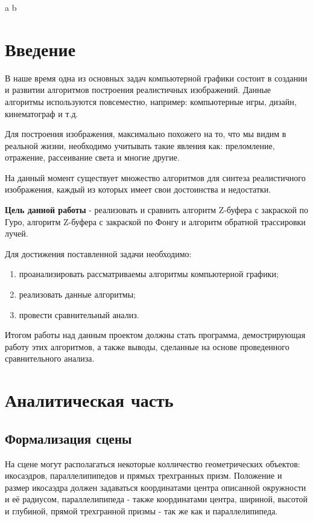 \documentclass[12pt]{report}
\begin{document}
	a
	\newpage
	b
	\newpage
	\tableofcontents
	\chapter*{Введение}
	В наше время одна из основных задач компьютерной графики состоит в создании и развитии алгоритмов построения реалистичных изображений. Данные алгоритмы используются повсеместно, например: компьютерные игры, дизайн, кинематограф и т.д. 
	
	Для построения изображения, максимально похожего на то, что мы видим в реальной жизни, необходимо учитывать такие явления как: преломление, отражение, рассеивание света и многие другие.
	
	На данный момент существует множество алгоритмов для синтеза реалистичного изображения, каждый из которых имеет свои достоинства и недостатки. 
	
	\textbf{Цель данной работы} - реализовать и сравнить алгоритм Z-буфера с закраской по Гуро, алгоритм Z-буфера с закраской по Фонгу и алгоритм обратной трассировки лучей.
	
	Для достижения поставленной задачи необходимо:
	\begin{enumerate}
		\item проанализировать рассматриваемы алгоритмы компьютерной графики;
		\item реализовать данные алгоритмы;
		\item провести сравнительный анализ.
	\end{enumerate}

	Итогом работы над данным проектом должны стать программа, демострирующая работу этих алгоритмов, а также выводы, сделанные на основе проведенного сравнительного анализа.
	
	\chapter{Аналитическая часть}
	\section{Формализация сцены}
	
		На сцене могут располагаться некоторые колличество геометрических объектов: икосаэдров, параллелипипедов и прямых трехгранных призм. Положение и размер икосаэдра должен задаваться координатами центра описанной окружности и её радиусом, параллелипипеда - также координатами центра, шириной, высотой и глубиной, прямой трехгранной призмы - так же как и параллелипипеда.
		
\end{document}

